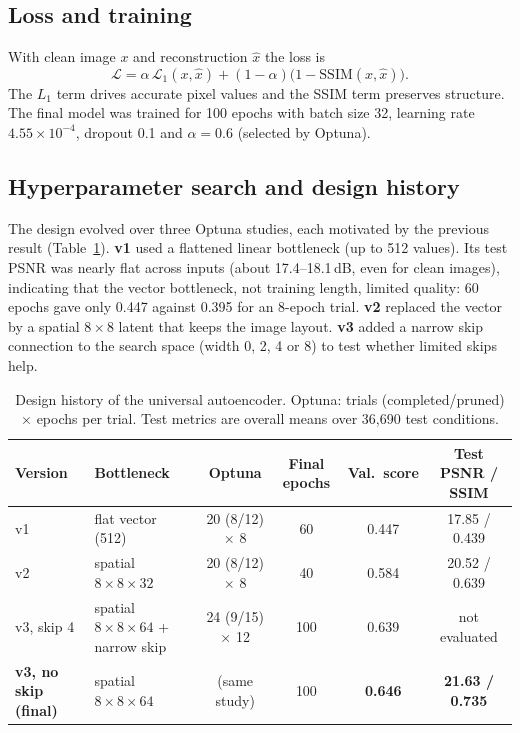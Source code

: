 \documentclass[conference]{IEEEtran}
\newcommand{\ssim}{\mathrm{SSIM}}
\newcommand{\lone}{\mathcal{L}_1}
\begin{document}
\subsection{Loss and training}
With clean image $x$ and reconstruction $\hat{x}$ the loss is
\begin{equation}
\mathcal{L}=\alpha\,\lone(x,\hat{x})+(1-\alpha)\bigl(1-\ssim(x,\hat{x})\bigr).
\end{equation}
The $L_1$ term drives accurate pixel values and the SSIM term preserves structure. The final model was trained for 100 epochs with batch size 32, learning rate $4.55\times10^{-4}$, dropout 0.1 and $\alpha=0.6$ (selected by Optuna).

\subsection{Hyperparameter search and design history}
The design evolved over three Optuna studies, each motivated by the previous result (Table~\ref{tab:t1hist}). \textbf{v1} used a flattened linear bottleneck (up to 512 values). Its test PSNR was nearly flat across inputs (about 17.4--18.1\,dB, even for clean images), indicating that the vector bottleneck, not training length, limited quality: 60 epochs gave only 0.447 against 0.395 for an 8-epoch trial. \textbf{v2} replaced the vector by a spatial $8{\times}8$ latent that keeps the image layout. \textbf{v3} added a narrow skip connection to the search space (width 0, 2, 4 or 8) to test whether limited skips help.

\begin{table}[t]
\centering
\caption{Design history of the universal autoencoder. Optuna: trials (completed/pruned) $\times$ epochs per trial. Test metrics are overall means over 36{,}690 test conditions.}\label{tab:t1hist}
\footnotesize\setlength{\tabcolsep}{4pt}
\begin{tabular}{@{}llcccc@{}}
\toprule
Version & Bottleneck & Optuna & Final epochs & Val.\ score & Test PSNR / SSIM\\
\midrule
v1 & flat vector (512) & 20 (8/12) $\times$ 8 & 60 & 0.447 & 17.85 / 0.439\\
v2 & spatial $8{\times}8{\times}32$ & 20 (8/12) $\times$ 8 & 40 & 0.584 & 20.52 / 0.639\\
v3, skip 4 & spatial $8{\times}8{\times}64$ + narrow skip & 24 (9/15) $\times$ 12 & 100 & 0.639 & not evaluated\\
\textbf{v3, no skip (final)} & spatial $8{\times}8{\times}64$ & (same study) & 100 & \textbf{0.646} & \textbf{21.63 / 0.735}\\
\bottomrule
\end{tabular}
\end{table}
\end{document}
